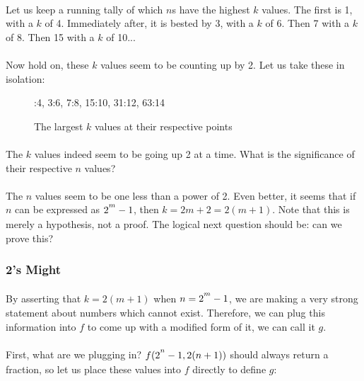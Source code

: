 \documentclass[12pt,letterpaper]{article}
\begin{document}
			\paragraph{} Let us keep a running tally of which $n$s have the highest $k$ values. The first is 1, with a $k$ of 4. Immediately after, it is bested by 3, with a $k$ of 6. Then 7 with a $k$ of 8. Then 15 with a $k$ of 10...
			
			\paragraph{} Now hold on, these $k$ values seem to be counting up by 2. Let us take these in isolation:
			
			\begin{figure}[h]
				:4, 3:6, 7:8, 15:10, 31:12, 63:14
				
				\caption{The largest $k$ values at their respective points}
			\end{figure}
		
			
			\paragraph{} The $k$ values indeed seem to be going up 2 at a time. What is the significance of their respective $n$ values?
			
			\paragraph{} The $n$ values seem to be one less than a power of 2. Even better, it seems that if $n$ can be expressed as $2\strut^m - 1$, then $k = 2m + 2 = 2(m + 1)$. Note that this is merely a hypothesis, not a proof. The logical next question should be: can we prove this?
			
		\subsubsection{2's Might}
			
			\paragraph{} By asserting that $k = 2(m + 1)$ when $n = 2\strut^m - 1$, we are making a very strong statement about numbers which cannot exist. Therefore, we can plug this information into $f$ to come up with a modified form of it, we can call it $g$.
			
			\paragraph{} First, what are we plugging in? $f(2\strut^n-1, 2(n + 1))$ should always return a fraction, so let us place these values into $f$ directly to define $g$:
			
\end{document}
